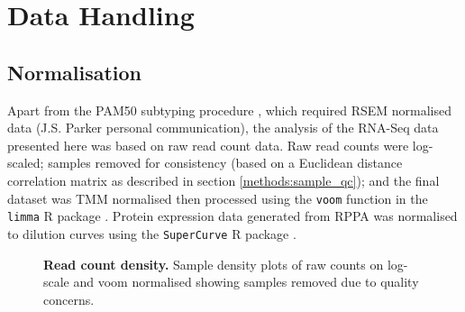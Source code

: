 \section{Data Handling}

\subsection{Normalisation}

Apart from the PAM50 subtyping procedure \citep{Parker2009}, which required RSEM normalised data (J.S. Parker personal communication), the analysis of the RNA-Seq data presented here was based on raw read count data. Raw read counts were log-scaled; samples removed for consistency (based on a Euclidean distance correlation matrix as described in section \ref{methods:sample_qc}); and the final dataset was TMM normalised \citep{Robinson2010} then processed using the \texttt{voom} function \citep{Law2014} in the \texttt{limma} R package \citep{limma}. Protein expression data generated from RPPA was normalised to dilution curves using the \texttt{SuperCurve} R package .

\begin{figure}[!ht]
\begin{mdframed}
   \begin{center}
%
%
\end{center}
\caption[Read count density]{\small \textbf{Read count density.} Sample density plots of raw counts on log-scale and voom normalised showing samples removed due to quality concerns.}
\label{fig:density}
\end{mdframed}
\end{figure}

